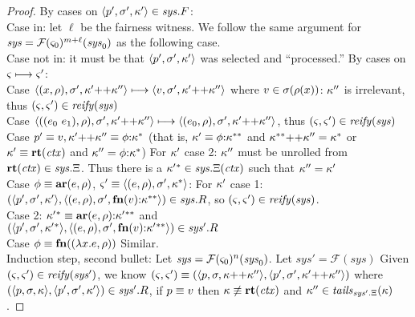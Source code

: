 \begin{proof}
   \noindent By cases on $\langle p',\sigma',\kappa' \rangle \in \mathit{sys}.F$:
\\
    Case in: let $\ell$ be the fairness witness. We follow the same argument for $\mathit{sys}={\mathcal F}(\varsigma_0)^{m+\ell}(\mathit{sys}_0)$ as
              the following case.
\\
    Case not in: it must be that $\langle p',\sigma',\kappa' \rangle$ was selected and ``processed.''
                 By cases on $\varsigma \longmapsto \varsigma'$:
\\
        Case $\langle (x,\rho),\sigma',\kappa' {\tt ++} \kappa'' \rangle \longmapsto \langle v,\sigma',\kappa' {\tt ++} \kappa'' \rangle$ where $v \in \sigma(\rho(x))$:
        $\kappa''$ is irrelevant, thus $(\varsigma,\varsigma') \in \mathit{reify}(\mathit{sys})$
\\
        Case $\tpl{((\mexpri0\ \mexpri1),\menv),\mstore',\append{\mkont'}{\mkont''}} \stepto \tpl{(\mexpri0, \menv),\mstore',\append{\mkont'}{\mkont''}}$,
        thus $(\varsigma,\varsigma') \in \mathit{reify}(\mathit{sys})$
\\
        Case $p'\equiv v, \kappa' {\tt ++} \kappa''\equiv\phi{\tt :} \kappa^*$ (that is, $\kappa' \equiv \phi{\tt :} \kappa^{**}$ and $\kappa^{**} {\tt ++} \kappa''=\kappa^*$ or $\kappa'\equiv\mathbf{rt}(\mathit{ctx})$ and $\kappa''=\phi{\tt :} \kappa^*$)
         For $\kappa'$ case 2: $\kappa''$ must be unrolled from $\mathbf{rt}(\mathit{ctx}) \in \mathit{sys}.\Xi$.
                         Thus there is a $\kappa'{}^* \in \mathit{sys}.\Xi(\mathit{ctx})$ such that $\kappa'' = \kappa'$
\\
         Case $\phi\equiv\mathbf{ar}{}(e,\rho)$, $\varsigma' \equiv \langle (e,\rho),\sigma',\kappa^* \rangle$:
          For $\kappa'$ case 1: $(\langle p',\sigma',\kappa' \rangle, \langle (e,\rho),\sigma',\mathbf{fn}{}(v){\tt :} \kappa^{**} \rangle) \in \mathit{sys}.R$, so $(\varsigma,\varsigma') \in \mathit{reify}(\mathit{sys})$.
\\
          Case 2: $\kappa'{}^* \equiv \mathbf{ar}{}(e,\rho){\tt :} \kappa'{}^{**}$ and
          \\ $(\langle p',\sigma',\kappa'{}^* \rangle,\langle (e,\rho),\sigma',\mathbf{fn}{}(v){\tt :} \kappa'{}^{**} \rangle) \in \mathit{sys'}.R$
\\
         Case $\phi\equiv\mathbf{fn}{}((\lambda{} x. e, \rho))$
          Similar.
\\

\noindent  Induction step, second bullet:
Let $\mathit{sys} = {\mathcal F}(\varsigma_0)^n(\mathit{sys}_0)$.
Let $\mathit{sys}' = {\mathcal F}(\mathit{sys})$
Given $(\varsigma,\varsigma') \in \mathit{reify}(\mathit{sys}')$,
%
we know $(\varsigma,\varsigma') \equiv (\langle p,\sigma,\kappa {\tt ++} \kappa'' \rangle,\langle p',\sigma',\kappa' {\tt ++} \kappa'' \rangle)$ where
\\$(\langle p,\sigma,\kappa \rangle,\langle p',\sigma',\kappa' \rangle) \in \mathit{sys}'.R$, if $p \equiv v$ then $\mkont \nequiv \krt{\mctx}$ and $\kappa'' \in \mathit{tails}_{\mathit{sys}'.\Xi}(\kappa)$.


\end{proof}
